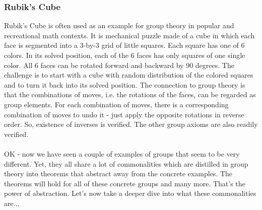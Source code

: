 


\subsubsection{Rubik's Cube} Rubik's Cube is often used as an example for group theory in popular and recreational math contexts. It is mechanical puzzle made of a cube in which each face is segmented into a 3-by-3 grid of little squares. Each square has one of 6 colors. In its solved position, each of the 6 faces has only squares of one single color. All 6 faces can be rotated forward and backward by 90 degrees. The challenge is to start with a cube with random distribution of the colored squares and to turn it back into its solved position. The connection to group theory is that the combinations of moves, i.e. the rotations of the faces, can be regarded as group elements. For each combination of moves, there is a corresponding combination of moves to undo it - just apply the opposite rotations in reverse order. So, existence of inverses is verified. The other group axioms are also readily verified.




\paragraph{}
OK - now we have seen a couple of examples of groups that seem to be very different. Yet, they all share a lot of commonalities which are distilled in group theory into theorems that abstract away from the concrete examples. The theorems will hold for all of these concrete groups and many more. That's the power of abstraction. Let's now take a deeper dive into what these commonalities are...

